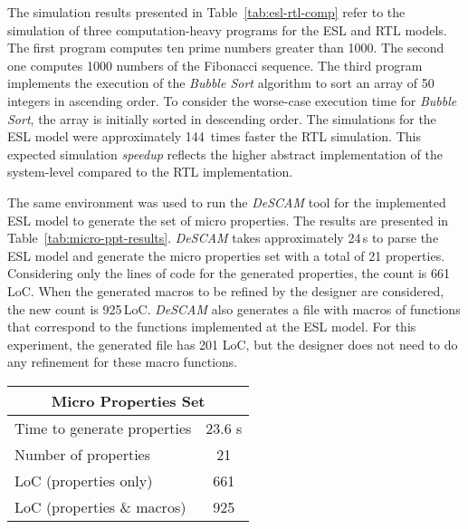 The simulation results presented in Table~\ref{tab:esl-rtl-comp} refer to the simulation of three computation-heavy programs for the ESL and RTL models. The first program computes ten prime numbers greater than 1000. The second one computes 1000 numbers of the Fibonacci sequence. The third program implements the execution of the \textit{Bubble Sort} algorithm to sort an array of 50 integers in ascending order. To consider the worse-case execution time for \textit{Bubble Sort}, the array is initially sorted in descending order. The simulations for the ESL model were approximately 144~times faster the RTL simulation. This expected simulation \textit{speedup} reflects the higher abstract implementation of the system-level compared to the RTL implementation.

The same environment was used to run the \textit{DeSCAM} tool for the implemented ESL model to generate the set of micro properties. The results are presented in Table~\ref{tab:micro-ppt-results}. \textit{DeSCAM} takes approximately 24\,s to parse the ESL model and generate the micro properties set with a total of 21 properties. Considering only the lines of code for the generated properties, the count is 661\,LoC. When the generated macros to be refined by the designer are considered, the new count is 925\,LoC. \textit{DeSCAM} also generates a file with macros of functions that correspond to the functions implemented at the ESL model. For this experiment, the generated file has 201 LoC, but the designer does not need to do any refinement for these macro functions.  

\begin{table*}[htb!] 
	\centering 
	\caption{Results for micro properties generated by \textit{DeSCAM} from the RI5CY ESL model.} 
	\label{tab:micro-ppt-results}
	\begin{tabular}{p{6cm} c } 
		\multicolumn{2}{c}{\textbf{Micro Properties Set}} \\  
		\hline	
		Time to generate properties  &  23.6 s  \\
		Number of properties  &  21 \\
		LoC (properties only)  &  661 \\
		LoC (properties \& macros)  &  925\\
	\end{tabular} 
\end{table*}

